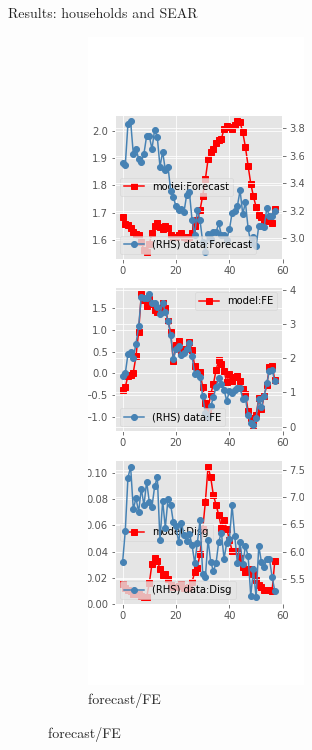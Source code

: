 \documentclass{beamer}
\begin{document}
\begin{frame}{Results: households and SEAR}
\begin{figure}[ht]
\begin{subfigure}[b]{0.19\textwidth}
	\end{subfigure}
\hfill
\begin{subfigure}[b]{0.19\textwidth}
	\caption{forecast/FE}
	\includegraphics[width=\textwidth, height = 0.8\textheight]{figuresDraft/sce_se_est_diag2.png}

\end{subfigure}
\end{figure}
\end{frame}
\end{document}
